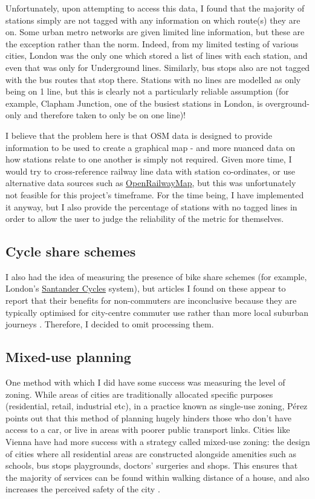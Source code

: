 \documentclass[12pt]{article} %
\begin{document}
Unfortunately, upon attempting to access this data, I found that the majority of stations simply are not tagged with any information on which route(s) they are on. Some urban metro networks are given limited line information, but these are the exception rather than the norm. Indeed, from my limited testing of various cities, London was the only one which stored a list of lines with each station, and even that was only for Underground lines. Similarly, bus stops also are not tagged with the bus routes that stop there. Stations with no lines are modelled as only being on 1 line, but this is clearly not a particularly reliable assumption (for example, Clapham Junction, one of the busiest stations in London, is overground-only and therefore taken to only be on one line)!

I believe that the problem here is that OSM data is designed to provide information to be used to create a graphical map - and more nuanced data on how stations relate to one another is simply not required. Given more time, I would try to cross-reference railway line data with station co-ordinates, or use alternative data sources such as \href{https://www.openrailwaymap.org/}{OpenRailwayMap}, but this was unfortunately not feasible for this project's timeframe. For the time being, I have implemented it anyway, but I also provide the percentage of stations with no tagged lines in order to allow the user to judge the reliability of the metric for themselves.

\subsection{Cycle share schemes}
I also had the idea of measuring the presence of bike share schemes (for example, London's \href{https://tfl.gov.uk/modes/cycling/santander-cycles}{Santander Cycles} system), but articles I found on these appear to report that their benefits for non-commuters are inconclusive because they are typically optimised for city-centre commuter use rather than more local suburban journeys \parencite{Beecham2014}. Therefore, I decided to omit processing them.

\subsection{Mixed-use planning}
One method with which I did have some success was measuring the level of zoning. While areas of cities are traditionally allocated specific purposes (residential, retail, industrial etc), in a practice known as single-use zoning, Pérez \citeyearpar{Perez2019} points out that this method of planning hugely hinders those who don't have access to a car, or live in areas with poorer public transport links. Cities like Vienna have had more success with a strategy called mixed-use zoning: the design of cities where all residential areas are constructed alongside amenities such as schools, bus stops playgrounds, doctors' surgeries and shops. This ensures that the majority of services can be found within walking distance of a house, and also increases the perceived safety of the city \parencite{Perez2019}.
\end{document}

